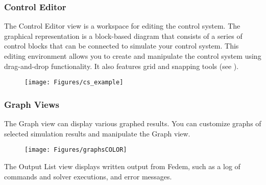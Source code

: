\subsubsection{Control Editor}

The Control Editor view is a workspace for editing the control system.
The graphical representation is a block-based diagram that consists of a series
of control blocks that can be connected to simulate your control system.
This editing environment allows you to create and manipulate the control system
using drag-and-drop functionality. It also features grid and snapping tools
(see ).


\begin{figure}[H]
  \center\texttt{[image: Figures/cs\_example]}
\end{figure}


\subsubsection{Graph Views}

The Graph view can display various graphed results. You can customize graphs
of selected simulation results and manipulate the Graph view.


\begin{figure}[H]
  \center\texttt{[image: Figures/graphsCOLOR]}
\end{figure}


\def\OutputList{\protect\hyperlink{output-list}{\sl Output List}~}

The Output List view displays written output from Fedem,
such as a log of commands and solver executions, and error messages.

